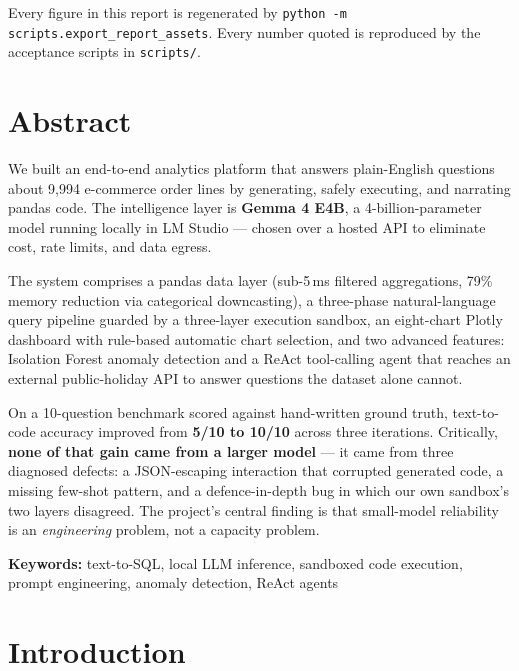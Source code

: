 \documentclass[11pt,a4paper]{article}
\newcommand{\note}[1]{\textcolor{muted}{\small #1}}
\begin{document}
\begin{titlepage}
\vfill
\note{Every figure in this report is regenerated by \texttt{python -m scripts.export\_report\_assets}.
Every number quoted is reproduced by the acceptance scripts in \texttt{scripts/}.}
\end{titlepage}

\section{Abstract}

We built an end-to-end analytics platform that answers plain-English questions about
9,994 e-commerce order lines by generating, safely executing, and narrating pandas
code. The intelligence layer is \textbf{Gemma 4 E4B}, a 4-billion-parameter model
running locally in LM Studio --- chosen over a hosted API to eliminate cost, rate
limits, and data egress.

The system comprises a pandas data layer (sub-5\,ms filtered aggregations, 79\%
memory reduction via categorical downcasting), a three-phase natural-language query
pipeline guarded by a three-layer execution sandbox, an eight-chart Plotly dashboard
with rule-based automatic chart selection, and two advanced features: Isolation
Forest anomaly detection and a ReAct tool-calling agent that reaches an external
public-holiday API to answer questions the dataset alone cannot.

On a 10-question benchmark scored against hand-written ground truth, text-to-code
accuracy improved from \textbf{5/10 to 10/10} across three iterations. Critically,
\textbf{none of that gain came from a larger model} --- it came from three diagnosed
defects: a JSON-escaping interaction that corrupted generated code, a missing
few-shot pattern, and a defence-in-depth bug in which our own sandbox's two layers
disagreed. The project's central finding is that small-model reliability is an
\emph{engineering} problem, not a capacity problem.

\vspace{0.3cm}
\noindent\textbf{Keywords:} text-to-SQL, local LLM inference, sandboxed code
execution, prompt engineering, anomaly detection, ReAct agents

\section{Introduction}
\end{document}
